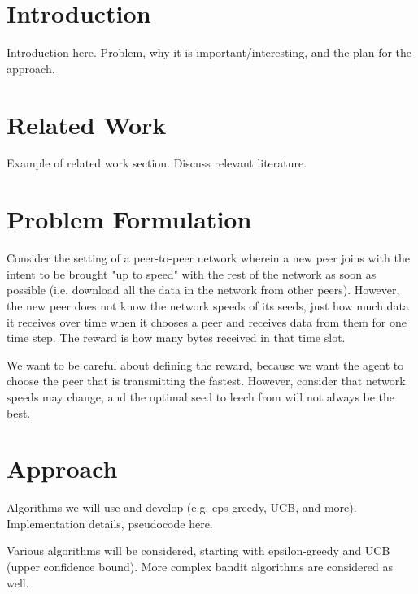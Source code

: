 \documentclass{article}
\begin{document}
\section{Introduction}
Introduction here. Problem, why it is important/interesting, and the plan for the approach.


\section{Related Work}

Example of related work section. Discuss relevant literature. \cite{mab_algos}


\section{Problem Formulation}

Consider the setting of a peer-to-peer network wherein a new peer joins with the intent to be brought "up to speed" with the rest of the network as soon as 
possible (i.e. download all the data in the network from other peers). However, the new peer does not know the network speeds of its seeds, just how much data 
it receives over time when it chooses a peer and receives data from them for one time step. The reward is how many bytes received in that time slot.

We want to be careful about defining the reward, because we want the agent to choose the peer that is transmitting the fastest. However, consider that network 
speeds may change, and the optimal seed to leech from will not always be the best.


\section{Approach}

Algorithms we will use and develop (e.g. eps-greedy, UCB, and more). Implementation details, pseudocode here.

Various algorithms will be considered, starting with epsilon-greedy and UCB (upper confidence bound). More complex bandit algorithms are considered as well.

\end{document}
